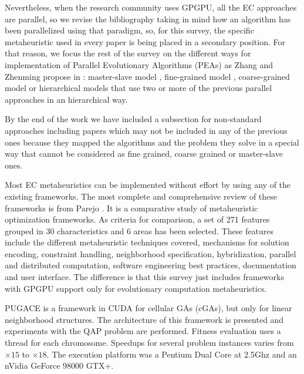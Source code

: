 \documentclass{comjnl}
\begin{document}
Nevertheless, when the research community uses GPGPU, all the EC approaches are parallel, so we revise the bibliography taking in mind how an algorithm has been parallelized using that paradigm, so, for this survey, the specific metaheuristic used in every paper is being placed in a secondary position.  For that reason, we focus the rest of the survey on the different ways for implementation of Parallel Evolutionary Algorithms (PEAs) as Zhang and Zhenming propose in \cite{ZhangImplementationMasterSlave}: master-slave model \cite{man-leung-wong-parallel-2005}, fine-grained model \cite{jian_ming_li_efficient_2007}, coarse-grained model \cite{Maitre:2009:CGP:1569901_1570089} \cite{pospichalParallelGeneticAlgorithOnCUDA2010} or hierarchical models  \cite{DBLP:conf/gecco/PospichalMOSJ11} that use two or more of the previous parallel approaches in an hierarchical way. 
 
By the end of the work we have included a subsection for non-standard approaches \cite{DBLP:conf/gecco/PospichalMOSJ11} including  papers which may not be included in any of the previous ones because they mapped the algorithms and the problem they solve in a special way that cannot be considered as fine grained, coarse grained or master-slave ones.


Most EC metaheuristics can be implemented without effort by using any of the existing frameworks. The most complete and comprehensive review of these frameworks is from Parejo \cite{springerlink:10.1007/s00500-011-0754-8}. It is a comparative study of metaheuristic optimization frameworks. As criteria for comparison, a set of 271 features grouped in 30 characteristics and 6 areas has been selected. These features include the different metaheuristic techniques covered, mechanisms for solution encoding, constraint handling, neighborhood specification, hybridization, parallel and distributed computation, software engineering best practices, documentation and user interface. The difference is that this survey just includes frameworks with GPGPU support only for evolutionary computation metaheuristics. 


PUGACE\cite{5586286} is a framework in CUDA for cellular GAs (cGAs), but only for linear neighborhood structures. The architecture of this framework is presented and experiments with the QAP problem are performed. Fitness evaluation uses a thread for each chromosome. Speedups for several problem instances varies from $\times15$ to $\times18$. The execution platform was a Pentium Dual Core at 2.5Ghz and an nVidia GeForce 98000 GTX+.
\end{document}
